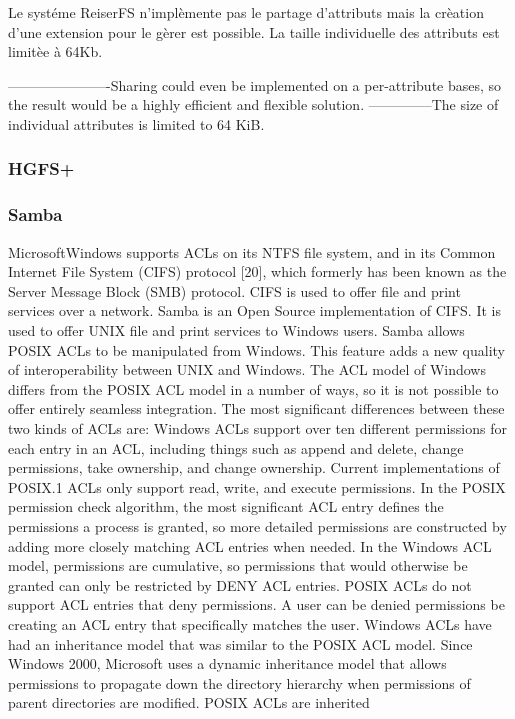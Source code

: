 Le systéme ReiserFS n'implèmente pas le partage d'attributs mais la crèation d'une extension pour le gèrer est possible. La taille individuelle des attributs est limitèe à 64Kb.

----------------------Sharing could even be implemented
on a per-attribute bases, so the result would be
a highly efficient and flexible solution. --------------The size of individual
attributes is limited to 64 KiB.

\subsubsection*{HGFS+}
\subsubsection*{Samba}
MicrosoftWindows supports ACLs on its NTFS file system,
and in its Common Internet File System (CIFS)
protocol [20], which formerly has been known as the
Server Message Block (SMB) protocol. CIFS is used to
offer file and print services over a network. Samba is an
Open Source implementation of CIFS. It is used to offer
UNIX file and print services to Windows users. Samba
allows POSIX ACLs to be manipulated from Windows.
This feature adds a new quality of interoperability between
UNIX and Windows.
The ACL model of Windows differs from the POSIX
ACL model in a number of ways, so it is not possible to
offer entirely seamless integration. The most significant
differences between these two kinds of ACLs are: Windows ACLs support over ten different permissions
for each entry in an ACL, including things
such as append and delete, change permissions,
take ownership, and change ownership. Current
implementations of POSIX.1 ACLs only support
read, write, and execute permissions.
In the POSIX permission check algorithm, the most
significant ACL entry defines the permissions a
process is granted, so more detailed permissions
are constructed by adding more closely matching
ACL entries when needed. In the Windows ACL
model, permissions are cumulative, so permissions
that would otherwise be granted can only be restricted
by DENY ACL entries.
POSIX ACLs do not support ACL entries that deny
permissions. A user can be denied permissions be
creating an ACL entry that specifically matches the
user.
Windows ACLs have had an inheritance model that
was similar to the POSIX ACL model. Since Windows
2000, Microsoft uses a dynamic inheritance
model that allows permissions to propagate down
the directory hierarchy when permissions of parent
directories are modified. POSIX ACLs are inherited
